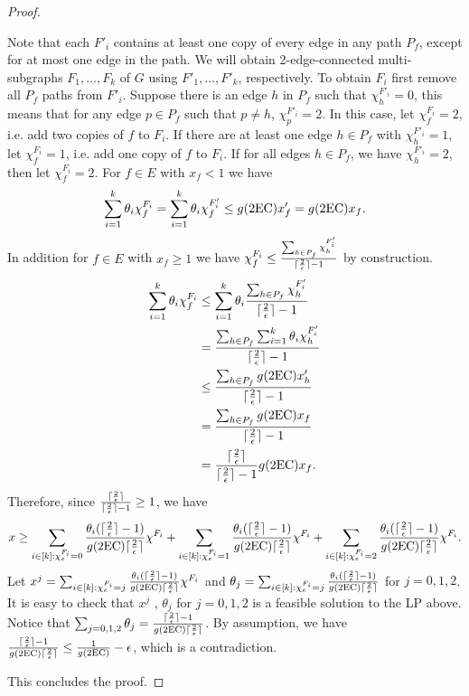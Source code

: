 \begin{proof}
\begin{cproof}
		Note that each $F'_i$ contains at least one copy of every edge in any path $P_f$, except for at most one edge in the path. We will obtain 2-edge-connected multi-subgraphs $F_1,\ldots,F_k$ of $G$ using $F'_1,\ldots,F'_k$, respectively. To obtain $F_i$ first remove all $P_f$ paths from $F'_i$. Suppose there is an edge $h$ in $P_f$ such that $\chi^{F'_i}_h=0$, this means that for any edge $p\in P_f$ such that $p\neq h$, $\chi^{F'_i}_p=2$. In this case, let $\chi^{F_i}_f=2$, i.e. add two copies of $f$ to $F_i$. If there are at least one edge $h\in P_f$ with $\chi^{F'_i}_h= 1$, let $\chi^{F_i}_f=1$, i.e. add one copy of $f$ to $F_i$. If for all edges $h\in P_f$, we have $\chi^{F'_i}_h=2$, then let $\chi^{F_i}_f=2$. For $f\in E$ with $x_f<1$ we have
		\begin{equation}
		\sum_{i=1}^{k}\theta_i \chi^{F_i}_f=\sum_{i=1}^{k}\theta_i \chi^{F'_i}_f\leq g(\2ec)x'_f= g(\2ec)x_f.
		\end{equation}
		In addition for $f\in E$ with $x_f\geq 1$ we have $\chi^{F_i}_f \leq \frac{\sum_{h\in P_f}\chi^{F'_i}_h}{\lceil\frac{2}{\epsilon}\rceil-1}$ by construction.
		\begin{align*}
		\sum_{i=1}^{k}\theta_i \chi^{F_i}_f&\leq \sum_{i=1}^{k}\theta_i\frac{\sum_{h\in P_f}\chi^{F'_i}_h}{\ceil{\frac{2}{\epsilon}}-1}\\
		&= \frac{\sum_{h\in P_f} \sum_{i=1}^{k}\theta_i\chi^{F'_i}_h}{\ceil{\frac{2}{\epsilon}}-1}\\
		&\leq \frac{\sum_{h\in P_f} g(\2ec)x'_h}{\ceil{\frac{2}{\epsilon}}-1}\\
		&= \frac{\sum_{h\in P_f} g(\2ec)x_f}{\ceil{\frac{2}{\epsilon}}-1}\\
		&= \frac{\ceil{\frac{2}{\epsilon}}}{\ceil{\frac{2}{\epsilon}}-1}g(\2ec)x_f.
		\end{align*}
		Therefore, since $\frac{\lceil\frac{2}{\epsilon}\rceil}{\lceil\frac{2}{\epsilon}\rceil-1}\geq 1$, we have 
		\begin{equation}
		x \geq\sum_{i\in [k]: \chi^{F_i}_e=0}\frac{\theta_i(\ceil{\frac{2}{\epsilon}}-1)}{g(\2ec)\ceil{\frac{2}{\epsilon}}}\chi^{F_i}+ \sum_{i\in [k]: \chi^{F_i}_e=1}\frac{\theta_i(\ceil{\frac{2}{\epsilon}}-1)}{g(\2ec)\ceil{\frac{2}{\epsilon}}}\chi^{F_i}+\sum_{i\in [k]: \chi^{F_i}_e=2}\frac{\theta_i(\ceil{\frac{2}{\epsilon}}-1)}{g(\2ec)\ceil{\frac{2}{\epsilon}}}\chi^{F_i}.
		\end{equation}
		Let $x^j = \sum_{i\in [k]: \chi^{F_i}_e=j}\frac{\theta_i(\ceil{\frac{2}{\epsilon}}-1)}{g(\2ec)\ceil{\frac{2}{\epsilon}}}\chi^{F_i}$ and $\theta_j =  \sum_{i\in [k]: \chi^{F_i}_e=j}\frac{\theta_i(\ceil{\frac{2}{\epsilon}}-1)}{g(\2ec)\ceil{\frac{2}{\epsilon}}}$ for $j=0,1,2$. It is easy to check that $x^j$ , $\theta_j$ for $j=0,1,2$ is a feasible solution to the LP above. Notice that $\sum_{j=0,1,2}\theta_j = \frac{\ceil{\frac{2}{\epsilon}}-1}{g(\2ec)\ceil{\frac{2}{\epsilon}}}$. By assumption, we have $\frac{\ceil{\frac{2}{\epsilon}}-1}{g(\2ec)\ceil{\frac{2}{\epsilon}}}\leq  \frac{1}{g(\2ec)}-\epsilon$, which is a contradiction.
	\end{cproof}
	This concludes the proof. \end{proof}
